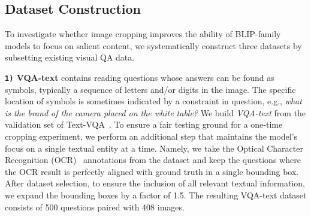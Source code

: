 

\subsection{Dataset Construction}

To investigate whether image cropping improves the ability of BLIP-family models to focus on salient content, we systematically construct three datasets by subsetting existing visual QA data.

\textbf{\texttt{1)} VQA-text} contains reading questions whose answers can be found as symbols, typically a sequence of letters and/or digits in the image. The specific location of symbols is sometimes indicated by a constraint in question, e.g., \textit{what is the brand of the camera placed on the white table?} We build \textit{VQA-text} from the validation set of Text-VQA~\citep{textvqa}. 
To ensure a fair testing ground for a one-time cropping experiment, we perform an additional step that maintains the model's focus on a single textual entity at a time. Namely, we take the Optical Character Recognition (OCR)~\citep{ocr} annotations from the dataset and keep the questions where the OCR result is perfectly aligned with ground truth in a single bounding box. 
After dataset selection, to ensure the inclusion of all relevant textual information, we expand the bounding boxes by a factor of 1.5. 
The resulting VQA-text dataset consists of 500 questions paired with 408 images.


